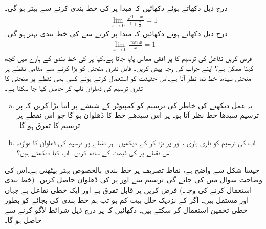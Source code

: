 \\
درج ذیل دکھاتے ہوئے دکھائیں کہ مبدا پر  کی  خط بندی  کرنے سے بہتر ہو گی۔
\begin{align*}
\lim_{x\to0}\frac{\sqrt{1+x}}{1+\tfrac{x}{2}}=1
\end{align*}
درج ذیل دکھاتے ہوئے دکھائیں کہ مبدا پر  کرنے سے  کی خط بندی بہتر ہو گی۔
\begin{align*}
\lim_{x\to 0}\frac{\tan x}{x}=1
\end{align*}
فرض کریں تفاعل  کی ترسیم کا  پر افقی مماس پایا جاتا ہے۔کیا  پر  کی خط بندی کے بارے میں کچھ کہنا ممکن ہے؟ اپنے جواب کی وجہ پیش کریں۔
\quad
قابل تفرق منحنی کو بڑا کرنے سے  مقامی نقطے پر منحنی سیدھا خط نما نظر آتا ہے۔اس حقیقت کو استعمال کرتے ہوئے کسی بھی نقطے پر منحنی کا تفرق ترسیم کی ڈھلوان ناپ کر حاصل کیا جا سکتا ہے۔ 
\begin{enumerate}[a.]
\item
یہ عمل دیکھنے کی خاطر  کی ترسیم کو کمپیوٹر کے شیشے پر  اتنا بڑا کریں کہ  پر ترسیم سیدھا خط نظر آتا ہو۔  پر اس سیدھے خط کا ڈھلوان  ہو گا جو اس نقطے پر ترسیم کا تفرق ہو گا۔
\item
اب  کی ترسیم کو باری باری ،  اور  پر بڑا کر کے دیکھیں۔ ہر نقطے پر ترسیم کی ڈھلوان کا موازنہ اس نقطے پر  کی قیمت کے ساتھ کریں۔ آپ کیا دیکھتے ہیں؟
\end{enumerate}
\quad
جیسا شکل  سے واضح ہے، نقاط تصریف پر خط بندی بالخصوص بہتر بیٹھتی ہے۔اس کی وضاحت  سوال  میں کی جائے گی۔ترسیم سے  اور  پر  کی ڈھلوان حاصل کریں۔
 (خط بندی استعمال کرنے کی وجہ۔)\quad
فرض کریں  پر  قابل تفرق ہے اور  ایک خطی تفاعل ہے جہاں  اور  مستقل ہیں۔ اگر  کے نزدیک خلل  بہت کم ہو تب ہم خط بندی  کی بجائے  کو بطور خطی تخمین استعمال کر سکتے ہیں۔ دکھائیں کہ   پر درج ذیل شرائط لاگو کرنے سے  حاصل ہو گا۔
